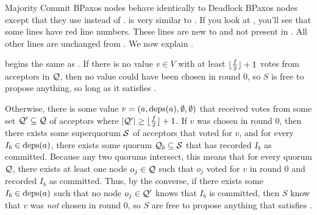 \begin{algorithm}[t!]
\end{algorithm}

Majority Commit BPaxos nodes behave identically to Deadlock BPaxos nodes except
that they use  instead of
.  is very similar to
. If you look at , you'll
see that some lines have red line numbers. These lines are new to
 and not present in . All
other lines are unchanged from . We now explain
.

 begins the same as . If
there is no value $v \in V$ with at least $\lfloor\frac{f}{2}\rfloor + 1$ votes from
acceptors in $\mathcal{Q}$, then no value could have been chosen in round $0$, so
$S$ is free to propose anything, so long as it satisfies
.

Otherwise, there is some value $v = (a, \text{deps}(a), \emptyset, \emptyset)$ that
received votes from some set $\mathcal{Q}' \subseteq \mathcal{Q}$ of acceptors where
$|\mathcal{Q}'| \geq \lfloor\frac{f}{2}\rfloor + 1$.
%
If $v$ was chosen in round 0, then there exists some superquorum $\mathcal{S}$
of acceptors that voted for $v$, and for every $I_b \in \text{deps}(a)$, there exists
some quorum $\mathcal{Q}_b \subseteq \mathcal{S}$ that has recorded $I_b$ as
committed. Because any two quorums intersect, this means that for every quorum
$\mathcal{Q}$, there exists at least one node $o_j \in \mathcal{Q}$ such that $o_j$
voted for $v$ in round $0$ and recorded $I_b$ as committed.
%
Thus, by the converse, if there exists some $I_b \in \text{deps}(a)$ such that no
node $o_j \in \mathcal{Q}'$ knows that $I_b$ is committed, then $S$ know that $v$
was \emph{not} chosen in round $0$, so $S$ are free to propose anything that
satisfies .

